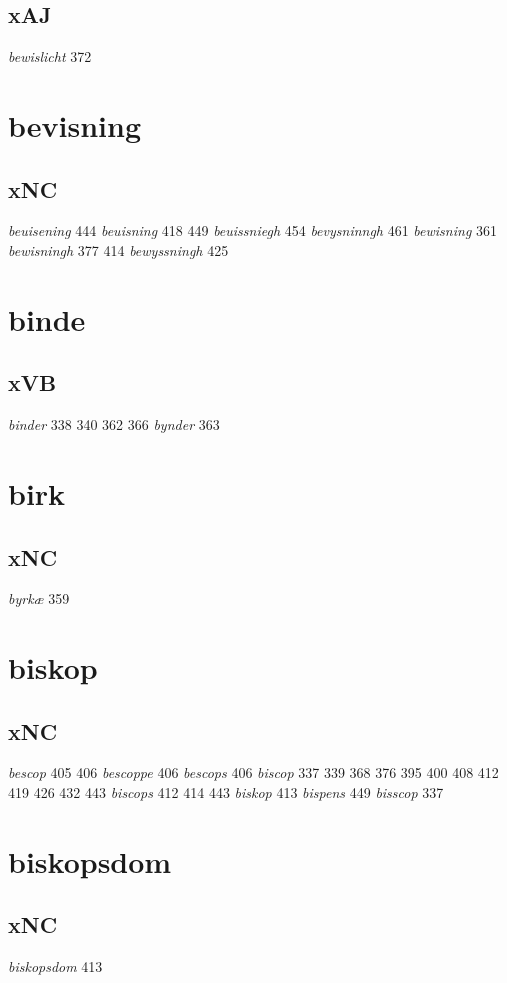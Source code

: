 \documentclass[a4paper,twocolumn]{article}
\begin{document}
\subsection{xAJ}
\label{sec:orgbfbcf06}
\emph{bewislicht} 372 
\section{bevisning}
\label{sec:orgbb0029f}
\subsection{xNC}
\label{sec:orgfd83a4b}
\emph{beuisening} 444 \emph{beuisning} 418 449 \emph{beuissniegh} 454 \emph{bevysninngh} 461 \emph{bewisning} 361 \emph{bewisningh} 377 414 \emph{bewyssningh} 425 
\section{binde}
\label{sec:org459a0d4}
\subsection{xVB}
\label{sec:org892b380}
\emph{binder} 338 340 362 366 \emph{bynder} 363 
\section{birk}
\label{sec:org7ff8eba}
\subsection{xNC}
\label{sec:org5a4b09d}
\emph{byrkæ} 359 
\section{biskop}
\label{sec:org1c8017b}
\subsection{xNC}
\label{sec:org9c8bfda}
\emph{bescop} 405 406 \emph{bescoppe} 406 \emph{bescops} 406 \emph{biscop} 337 339 368 376 395 400 408 412 419 426 432 443 \emph{biscops} 412 414 443 \emph{biskop} 413 \emph{bispens} 449 \emph{bisscop} 337 
\section{biskopsdom}
\label{sec:orgf7886a6}
\subsection{xNC}
\label{sec:org1c42151}
\emph{biskopsdom} 413 
\end{document}
